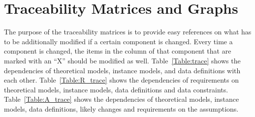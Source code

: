 \documentclass[12pt]{article}
\begin{document}
\section{Traceability Matrices and Graphs}

The purpose of the traceability matrices is to provide easy references on what 
has to be additionally modified if a certain component is changed.  Every time a 
component is changed, the items in the column of that component that are 
marked with an ``X'' should be modified as well.  Table~\ref{Table:trace}
shows the dependencies of theoretical models, instance models, and data 
definitions with each other. Table~\ref{Table:R_trace} shows the dependencies of 
requirements on theoretical models, instance models, data definitions and 
data constraints. Table~\ref{Table:A_trace} shows the dependencies 
of theoretical models, instance models, data definitions, likely changes and 
requirements on the assumptions.
\newline
\end{document}
